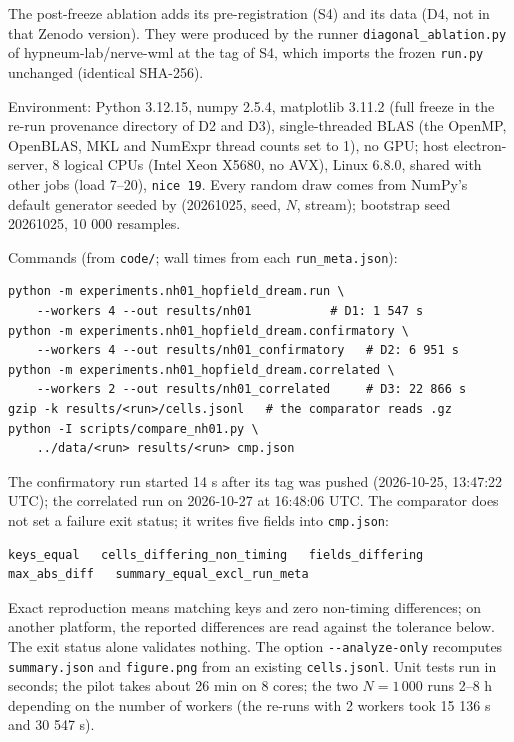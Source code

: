 The post-freeze ablation adds its pre-registration (S4) and its data
(D4, not in that Zenodo version). They were produced by the runner
\texttt{diagonal\_ablation.py} of hypneum-lab/nerve-wml at the tag of
S4, which imports the frozen \texttt{run.py} unchanged (identical
SHA-256).

Environment: Python 3.12.15, numpy 2.5.4, matplotlib 3.11.2 (full freeze
in the re-run provenance directory of D2 and D3), single-threaded BLAS
(the OpenMP, OpenBLAS, MKL and NumExpr thread counts set to 1), no GPU;
host electron-server, 8 logical CPUs (Intel Xeon X5680, no AVX), Linux
6.8.0, shared with other jobs (load 7--20), \texttt{nice\ 19}. Every
random draw comes from NumPy's default generator seeded by (20261025,
seed, \(N\), stream); bootstrap seed 20261025, 10 000 resamples.

Commands (from \texttt{code/}; wall times from each
\texttt{run\_meta.json}):

\begin{verbatim}
python -m experiments.nh01_hopfield_dream.run \
    --workers 4 --out results/nh01           # D1: 1 547 s
python -m experiments.nh01_hopfield_dream.confirmatory \
    --workers 4 --out results/nh01_confirmatory   # D2: 6 951 s
python -m experiments.nh01_hopfield_dream.correlated \
    --workers 2 --out results/nh01_correlated     # D3: 22 866 s
gzip -k results/<run>/cells.jsonl   # the comparator reads .gz
python -I scripts/compare_nh01.py \
    ../data/<run> results/<run> cmp.json
\end{verbatim}

The confirmatory run started 14 s after its tag was pushed (2026-10-25,
13:47:22 UTC); the correlated run on 2026-10-27 at 16:48:06 UTC. The
comparator does not set a failure exit status; it writes five fields
into \texttt{cmp.json}:

\begin{verbatim}
keys_equal   cells_differing_non_timing   fields_differing
max_abs_diff   summary_equal_excl_run_meta
\end{verbatim}

Exact reproduction means matching keys and zero non-timing differences;
on another platform, the reported differences are read against the
tolerance below. The exit status alone validates nothing. The option
\texttt{-\/-analyze-only} recomputes \texttt{summary.json} and
\texttt{figure.png} from an existing \texttt{cells.jsonl}. Unit tests
run in seconds; the pilot takes about 26 min on 8 cores; the two
\(N = 1\,000\) runs 2--8 h depending on the number of workers (the
re-runs with 2 workers took 15 136 s and 30 547 s).

